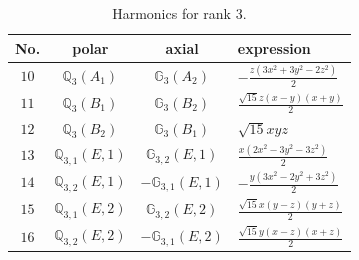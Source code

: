 \documentclass[fleqn,8pt,landscape]{jsarticle}
\begin{document}
\begin{table}[ht!]
\begin{center}
\caption{Harmonics for rank 3.}
\renewcommand{\arraystretch}{1.3}
\begin{tabular}{cccl} \hline \hline
No. & polar & axial & expression \\ \hline
$ 10 $ & $ \mathbb{Q}_{3}(A_{1}) $ & $ \mathbb{G}_{3}(A_{2}) $ & $ - \frac{z \left(3 x^{2} + 3 y^{2} - 2 z^{2}\right)}{2} $ \\
$ 11 $ & $ \mathbb{Q}_{3}(B_{1}) $ & $ \mathbb{G}_{3}(B_{2}) $ & $ \frac{\sqrt{15} z \left(x - y\right) \left(x + y\right)}{2} $ \\
$ 12 $ & $ \mathbb{Q}_{3}(B_{2}) $ & $ \mathbb{G}_{3}(B_{1}) $ & $ \sqrt{15} x y z $ \\
$ 13 $ & $ \mathbb{Q}_{3,1}(E,1) $ & $ \mathbb{G}_{3,2}(E,1) $ & $ \frac{x \left(2 x^{2} - 3 y^{2} - 3 z^{2}\right)}{2} $ \\
$ 14 $ & $ \mathbb{Q}_{3,2}(E,1) $ & $ -\mathbb{G}_{3,1}(E,1) $ & $ - \frac{y \left(3 x^{2} - 2 y^{2} + 3 z^{2}\right)}{2} $ \\
$ 15 $ & $ \mathbb{Q}_{3,1}(E,2) $ & $ \mathbb{G}_{3,2}(E,2) $ & $ \frac{\sqrt{15} x \left(y - z\right) \left(y + z\right)}{2} $ \\
$ 16 $ & $ \mathbb{Q}_{3,2}(E,2) $ & $ -\mathbb{G}_{3,1}(E,2) $ & $ \frac{\sqrt{15} y \left(x - z\right) \left(x + z\right)}{2} $ \\
 \hline \hline
\end{tabular}
\end{center}
\end{table}
\end{document}
